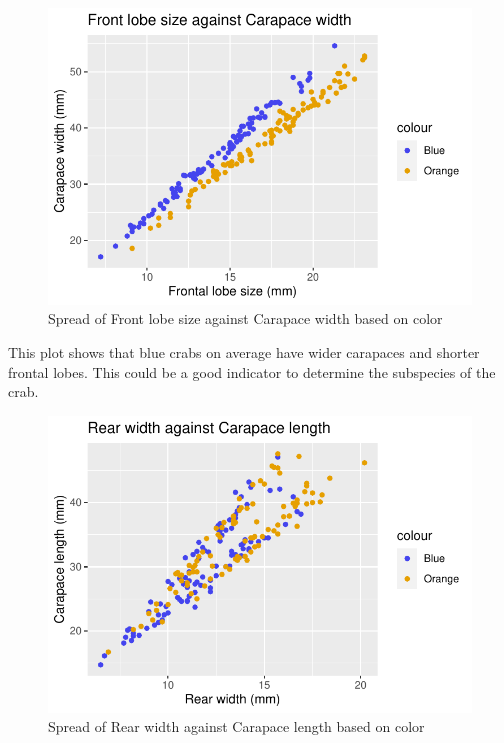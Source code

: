 \documentclass[
]{article}
\begin{document}
\begin{figure}[H]

{\centering \includegraphics{CrabProject_files/figure-latex/figure1-1} 

}

\caption{Spread of Front lobe size against Carapace width based on color}\label{fig:figure1}
\end{figure}

This plot shows that blue crabs on average have wider carapaces and
shorter frontal lobes. This could be a good indicator to determine the
subspecies of the crab.

\begin{figure}[H]

{\centering \includegraphics{CrabProject_files/figure-latex/figure2-1} 

}

\caption{Spread of Rear width against Carapace length based on color}\label{fig:figure2}
\end{figure}
\end{document}
